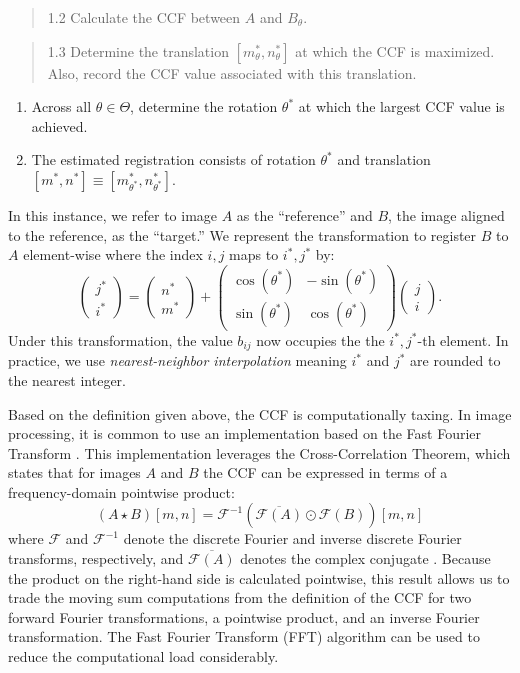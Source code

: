\documentclass[11pt,]{isuthesis}
\begin{document}
\begin{quote}
1.2 Calculate the CCF between \(A\) and \(B_\theta\).
\end{quote}

\begin{quote}
1.3 Determine the translation \([m_{\theta}^*,n_{\theta}^*]\) at which the CCF is maximized. Also, record the CCF value associated with this translation.
\end{quote}

\begin{enumerate}
\def\labelenumi{\arabic{enumi}.}
\setcounter{enumi}{1}
\item
  Across all \(\theta \in \Theta\), determine the rotation \(\theta^*\) at which the largest CCF value is achieved.
\item
  The estimated registration consists of rotation \(\theta^*\) and translation \([m^*,n^*] \equiv [m_{\theta^*}^*,n_{\theta^*}^*]\).
\end{enumerate}

In this instance, we refer to image \(A\) as the ``reference'' and \(B\), the image aligned to the reference, as the ``target.''
We represent the transformation to register \(B\) to \(A\) element-wise where the index \(i,j\) maps to \(i^*,j^*\) by:
\[
\begin{pmatrix} j^* \\ i^* \end{pmatrix} = \begin{pmatrix} n^* \\ m^* \end{pmatrix} + \begin{pmatrix} \cos(\theta^*) & -\sin(\theta^*) \\ \sin(\theta^*) & \cos(\theta^*) \end{pmatrix} \begin{pmatrix} j \\ i \end{pmatrix}.
\]
Under this transformation, the value \(b_{ij}\) now occupies the the \(i^*,j^*\)-th element.
In practice, we use \emph{nearest-neighbor interpolation} meaning \(i^*\) and \(j^*\) are rounded to the nearest integer.

Based on the definition given above, the CCF is computationally taxing.
In image processing, it is common to use an implementation based on the Fast Fourier Transform \citep{Brown1992}.
This implementation leverages the Cross-Correlation Theorem, which states that for images \(A\) and \(B\) the CCF can be expressed in terms of a frequency-domain pointwise product:
\[
(A \star B)[m,n] = \mathcal{F}^{-1}\left(\overline{\mathcal{F}(A)} \odot \mathcal{F}(B)\right)[m,n]
\]
where \(\mathcal{F}\) and \(\mathcal{F}^{-1}\) denote the discrete Fourier and inverse discrete Fourier transforms, respectively, and \(\overline{\mathcal{F}(A)}\) denotes the complex conjugate \citep{fft_brigham}.
Because the product on the right-hand side is calculated pointwise, this result allows us to trade the moving sum computations from the definition of the CCF for two forward Fourier transformations, a pointwise product, and an inverse Fourier transformation.
The Fast Fourier Transform (FFT) algorithm can be used to reduce the computational load considerably.
\end{document}
